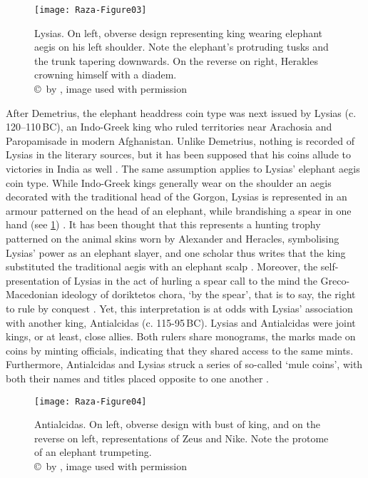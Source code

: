 \documentclass{ijsra}
\renewcommand\BC{{\,BC\xspace}}
\begin{document}
\begin{figure}[!htb] %
	\centering
	\texttt{[image: Raza-Figure03]}
	\caption{Lysias. On left, obverse design representing king wearing elephant aegis on his left shoulder. Note the elephant’s protruding tusks and the trunk tapering downwards. On the reverse on right, Herakles crowning himself with a diadem. 
		{\normalfont\scriptsize \\ \copyright\ by \cite{Coin}, image used with permission}}
	\label{fig:Raza-Figure03}
\end{figure}

After Demetrius, the elephant headdress coin type was next issued by Lysias (c. 120--110\BC), an Indo-Greek king who ruled
territories near Arachosia and Paropamisade in modern Afghanistan. 
Unlike Demetrius, nothing is recorded of Lysias in the literary sources, but it has been supposed that his coins allude to
victories in India as well \parencite[107]{Widemann2003}.
The same assumption applies to Lysias’ elephant aegis coin type. 
While Indo-Greek kings generally wear on the shoulder an aegis decorated with the traditional head of the Gorgon, Lysias is
represented in an armour patterned on the head of an elephant, while brandishing a spear in one hand (see \cref{fig:Raza-Figure03}) \parencite[71]{Whitehead1970}. 
It has been thought that this represents a hunting trophy patterned on the animal skins worn by Alexander and Heracles,
symbolising Lysias’ power as an elephant slayer, and one scholar thus writes that the king substituted the traditional aegis with
an elephant scalp \parencite[341]{Cribb2011}. 
Moreover, the self-presentation of Lysias in the act of hurling a spear call to the mind the Greco-Macedonian ideology of
doriktetos chora, ‘by the spear’, that is to say, the right to rule by conquest \parencite[27]{Billows1995}. 
Yet, this interpretation is at odds with Lysias’ association with another king, Antialcidas (c. 115-95\BC). 
Lysias and Antialcidas were joint kings, or at least, close allies. 
Both rulers share monograms, the marks made on coins by minting officials, indicating that they shared access to the same mints. 
Furthermore, Antialcidas and Lysias struck a series of so-called ‘mule coins’, with both their names and titles placed opposite to
one another \parencite[121]{Mairs2014}.

\begin{figure}[!htb] %
	\centering
	\texttt{[image: Raza-Figure04]}
	\caption{Antialcidas. On left, obverse design with bust of king, and on the reverse on left, representations of Zeus and Nike. Note the protome of an elephant trumpeting.
		{\normalfont\scriptsize \\ \copyright\ by \cite{Coin}, image used with permission}}
	\label{fig:Raza-Figure04}
\end{figure}
\end{document}
